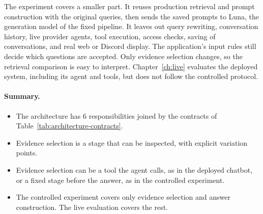 The experiment covers a smaller part. It reuses production retrieval and prompt construction with the original queries, then sends the saved prompts to Luna, the generation model of the fixed pipeline. It leaves out query rewriting, conversation history, live provider agents, tool execution, access checks, saving of conversations, and real web or Discord display. The application's input rules still decide which questions are accepted. Only evidence selection changes, so the retrieval comparison is easy to interpret. Chapter~\ref{ch:live} evaluates the deployed system, including its agent and tools, but does not follow the controlled protocol.

\paragraph{Summary.}
\begin{itemize}
  \item The architecture has 6 responsibilities joined by the contracts of Table~\ref{tab:architecture-contracts}.
  \item Evidence selection is a stage that can be inspected, with explicit variation points.
  \item Evidence selection can be a tool the agent calls, as in the deployed chatbot, or a fixed stage before the answer, as in the controlled experiment.
  \item The controlled experiment covers only evidence selection and answer construction. The live evaluation covers the rest.
\end{itemize}
